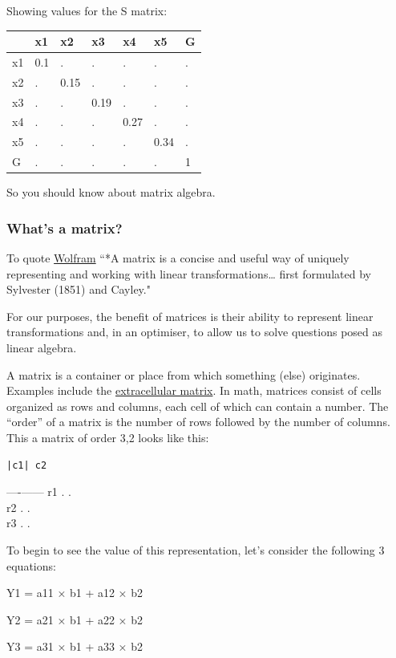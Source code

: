 \documentclass[11pt,]{article}
\begin{document}
Showing values for the S matrix:

\begin{longtable}[]{@{}lllllll@{}}
\toprule
& x1 & x2 & x3 & x4 & x5 & G\tabularnewline
\midrule
\endhead
x1 & 0.1 & . & . & . & . & .\tabularnewline
x2 & . & 0.15 & . & . & . & .\tabularnewline
x3 & . & . & 0.19 & . & . & .\tabularnewline
x4 & . & . & . & 0.27 & . & .\tabularnewline
x5 & . & . & . & . & 0.34 & .\tabularnewline
G & . & . & . & . & . & 1\tabularnewline
\bottomrule
\end{longtable}

So you should know about matrix algebra.

\subsubsection{What's a matrix?}\label{whats-a-matrix}

To quote \href{http://mathworld.wolfram.com/Matrix.html}{Wolfram} ``*A
matrix is a concise and useful way of uniquely representing and working
with linear transformations\ldots{} first formulated by Sylvester (1851)
and Cayley."

For our purposes, the benefit of matrices is their ability to represent
linear transformations and, in an optimiser, to allow us to solve
questions posed as linear algebra.

A matrix is a container or place from which something (else) originates.
Examples include the
\href{https://en.wikipedia.org/wiki/Extracellular_matrix}{extracellular
matrix}. In math, matrices consist of cells organized as rows and
columns, each cell of which can contain a number. The ``order'' of a
matrix is the number of rows followed by the number of columns. This a
matrix of order 3,2 looks like this:

\begin{verbatim}
|c1| c2 
\end{verbatim}

----\textbar{}---\textbar{}--- r1 \textbar{} . \textbar{} .\\
r2 \textbar{} . \textbar{} .\\
r3 \textbar{} . \textbar{} .

To begin to see the value of this representation, let's consider the
following 3 equations:

Y1 = a11 × b1 + a12 × b2

Y2 = a21 × b1 + a22 × b2

Y3 = a31 × b1 + a33 × b2
\end{document}
